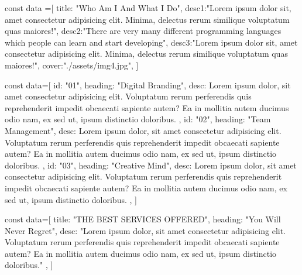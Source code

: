 const data =[
  {
    title: "Who Am I And What I Do",
    desc1:"Lorem ipsum dolor sit,
     amet consectetur adipisicing elit. Minima,
     delectus rerum similique voluptatum quas maiores!",
    desc2:"There are very many different programming languages which people can learn and start developing",
    desc3:"Lorem ipsum dolor sit,
     amet consectetur adipisicing elit. Minima,
     delectus rerum similique voluptatum quas maiores!",
     cover:"./assets/img4.jpg",
  }
]


const data=[
  {
    id: "01",
    heading: "Digital Branding",
    desc: Lorem ipsum dolor, sit amet consectetur adipisicing elit. Voluptatum rerum perferendis quis reprehenderit impedit obcaecati sapiente autem? Ea in mollitia autem ducimus odio nam, ex sed ut, ipsum distinctio doloribus.
  },
  {
    id: "02",
    heading: "Team Management",
    desc: Lorem ipsum dolor, sit amet consectetur adipisicing elit. Voluptatum rerum perferendis quis reprehenderit impedit obcaecati sapiente autem? Ea in mollitia autem ducimus odio nam, ex sed ut, ipsum distinctio doloribus.
  },
  {
    id: "03",
    heading: "Creative Mind",
    desc: Lorem ipsum dolor, sit amet consectetur adipisicing elit. Voluptatum rerum perferendis quis reprehenderit impedit obcaecati sapiente autem? Ea in mollitia autem ducimus odio nam, ex sed ut, ipsum distinctio doloribus.
  },
]



const data=[
  {
    title: "THE BEST SERVICES OFFERED",
    heading: "You Will Never Regret",
    desc: "Lorem ipsum dolor, sit amet consectetur adipisicing elit. Voluptatum rerum perferendis quis reprehenderit impedit obcaecati sapiente autem? Ea in mollitia autem ducimus odio nam, ex sed ut, ipsum distinctio doloribus."
  },
]